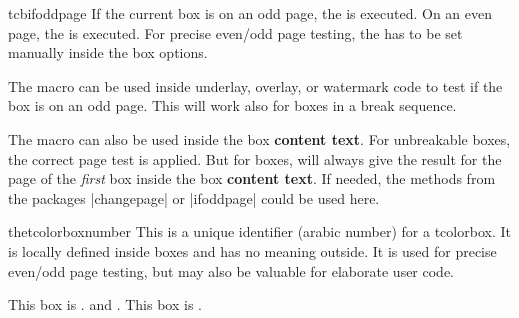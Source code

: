\enlargethispage*{2cm}
\begin{docCommand}[doc new=2015-11-13]{tcbifoddpage}{}
If the current box is on an odd page, the  is executed.
On an even page, the  is executed.
For precise even/odd page testing, the  has to be
set manually inside the box options.

The macro  can be used inside underlay, overlay, or watermark code to
test if the box is on an odd page. This will work also for boxes in a break sequence.

The macro can also be used inside the box \textbf{content text}. For unbreakable boxes,
the correct page test is applied.
But for  boxes, 
will always give the result for the page of the \emph{first} box inside
the box \textbf{content text}. If needed, the methods from the packages
|changepage| or |ifoddpage| could be used here.

\begin{dispExample}

\begin{tcolorbox}[enhanced,check odd page,
  title={Example for a box on an \tcbifoddpage{odd}{even} page},
  watermark text={\tcbifoddpage{Odd}{Even} page!}]
\lipsum[1]
\end{tcolorbox}
\end{dispExample}
\end{docCommand}


\clearpage
\begin{docCommand}[doc new=2015-11-13]{thetcolorboxnumber}{}
This is a unique identifier (arabic number) for a tcolorbox. It is locally
defined inside boxes and has no meaning outside. It is used for
precise even/odd page testing, but may also be valuable for elaborate user
code.

\begin{dispExample}
\begin{tcolorbox}[colback=yellow!5,title=Box \thetcolorboxnumber]
  This box is \thetcolorboxnumber.
   and
  .
  This box is \thetcolorboxnumber.
\end{tcolorbox}
\end{dispExample}
\end{docCommand}


